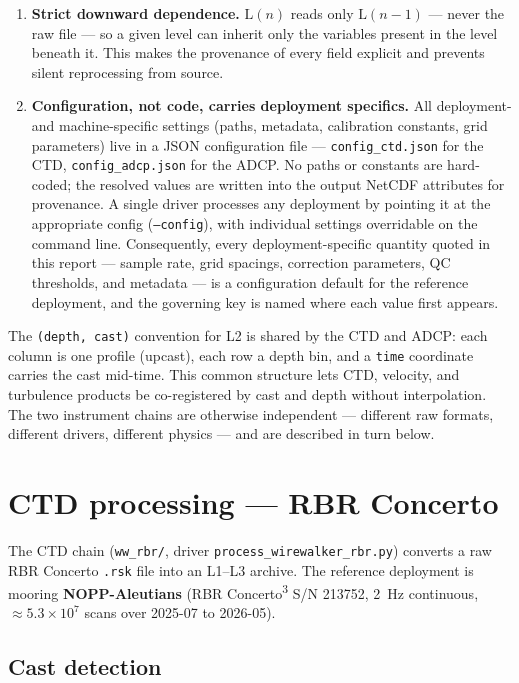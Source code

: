 \documentclass[11pt]{article}
\newcommand{\code}[1]{\texttt{#1}}
\begin{document}
\begin{enumerate}
\item \textbf{Strict downward dependence.} $\mathrm{L}(n)$ reads only $\mathrm{L}(n-1)$ ---
never the raw file --- so a given level can inherit only the variables present in the level
beneath it. This makes the provenance of every field explicit and prevents silent
reprocessing from source.

\item \textbf{Configuration, not code, carries deployment specifics.} All deployment- and
machine-specific settings (paths, metadata, calibration constants, grid parameters) live in
a JSON configuration file --- \code{config\_ctd.json} for the CTD, \code{config\_adcp.json}
for the ADCP. No paths or constants are hard-coded; the resolved values are written into the
output NetCDF attributes for provenance. A single driver processes any deployment by pointing
it at the appropriate config (\code{--config}), with individual settings overridable on the
command line. Consequently, every deployment-specific quantity quoted in this report ---
sample rate, grid spacings, correction parameters, QC thresholds, and metadata --- is a
configuration default for the reference deployment, and the governing key is named where each
value first appears.
\end{enumerate}

The \code{(depth, cast)} convention for L2 is shared by the CTD and ADCP: each column is one
profile (upcast), each row a depth bin, and a \code{time} coordinate carries the cast
mid-time. This common structure lets CTD, velocity, and turbulence products be co-registered
by cast and depth without interpolation. The two instrument chains are otherwise independent
--- different raw formats, different drivers, different physics --- and are described in turn
below.

\section{CTD processing --- RBR Concerto}

The CTD chain (\code{ww\_rbr/}, driver \code{process\_wirewalker\_rbr.py}) converts a raw RBR
Concerto \code{.rsk} file into an L1--L3 archive. The reference deployment is mooring
\textbf{NOPP-Aleutians} (RBR Concerto\textsuperscript{3} S/N 213752, 2~Hz continuous,
$\approx 5.3\times10^{7}$ scans over 2025-07 to 2026-05).

\subsection{Cast detection}
\end{document}
